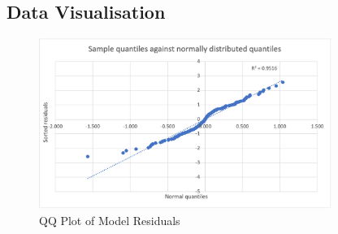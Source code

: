 \documentclass{article}
\begin{document}
\newpage
\clearpage
{}
\begin{appendices}

\section{Data Visualisation}\label{AppA}

\begin{figure}[H]
    \centering
    \includegraphics[width=0.85\textwidth]{Images/QQplot.png}
    \caption{QQ Plot of Model Residuals}
    \label{fig:qqplotresid}
\end{figure}


\end{appendices}
\end{document}
